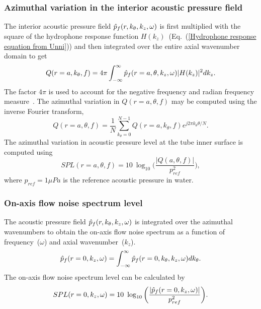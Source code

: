 \documentclass[11pt,cleanfoot]{asme2ej}
\begin{document}
\subsubsection{Azimuthal variation in the interior acoustic pressure field}
The interior acoustic pressure field $\Hat{p}_f(r,k_\theta,k_z,\omega)$ is first multiplied with the square of the hydrophone response function $H(k_z)$~(Eq.~(\ref{Hydrophone response equation from Unni})) and then integrated over the entire axial wavenumber domain to get
\begin{equation}\label{acoustic pressure field inside}
    Q(r=a,k_\theta,f) =  4\pi\int_{-\infty}^{\infty}  \Hat{p}_f(r=a,\theta,k_z,\omega)|H(k_z)|^2dk_z.
\end{equation}
The factor $4\pi$ is used to account for the negative frequency and radian frequency measure~\cite{carpenter1983,knight1996,KUTTANCHANDRIKA2014}. The azimuthal variation in $Q(r=a,\theta,f)$ may be computed using the inverse Fourier transform,
\begin{equation}\label{ifft theta inside pressure}
    Q(r=a,\theta,f) = \frac{1}{N}\sum_{k_\theta = 0}^{N-1} Q(r=a,k_\theta,f)e^{j2\pi k_\theta \theta/N}.
\end{equation}
The azimuthal variation in acoustic pressure level at the tube inner surface is computed using
\begin{equation}\label{SPL for theta variation}
    SPL(r=a,\theta,f) = 10~\log_{10}\bigg(\frac{|Q(a,\theta,f)|}{p_{ref}^2}\bigg),
\end{equation}
where $p_{ref} = 1\mu Pa$ is the reference acoustic pressure in water.
\subsubsection{On-axis flow noise spectrum level}
The acoustic pressure field $\Hat{p}_f(r,k_\theta,k_z,\omega)$ is integrated over the azimuthal wavenumbers to obtain the on-axis flow noise spectrum as a function of frequency~($\omega$) and axial wavenumber~($k_z$).
\begin{equation}\label{on-axis flow noise spectrum}
    \Hat{p}_f(r=0,k_z,\omega) = \int_{-\infty}^{\infty} \Hat{p}_f(r=0,k_\theta,k_z,\omega) dk_\theta.
\end{equation}
The on-axis flow noise spectrum level can be calculated by
\begin{equation}\label{SPL flow noise spectrum}
    SPL(r=0,k_z,\omega) = 10~\log_{10}\bigg(\frac{|\Hat{p}_f(r=0,k_z,\omega)|}{p_{ref}^2}\bigg).
\end{equation}
\end{document}
